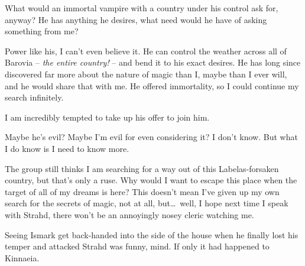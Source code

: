 What would an immortal vampire with a country under his control ask for, anyway? He has anything he desires, what need would he have of asking something from me?

Power like his, I can't even believe it. He can control the weather across all of Barovia -- \emph{the entire country!} -- and bend it to his exact desires. He has long since discovered far more about the nature of magic than I, maybe than I ever will, and he would share that with me. He offered immortality, so I could continue my search infinitely.

I am incredibly tempted to take up his offer to join him.

Maybe he's evil? Maybe I'm evil for even considering it? I don't know. But what I do know is I need to know more.

The group still thinks I am searching for a way out of this Labelas-forsaken country, but that's only a ruse. Why would I want to escape this place when the target of all of my dreams is here? This doesn't mean I've given up my own search for the secrets of magic, not at all, but\dots\ well, I hope next time I speak with Strahd, there won't be an annoyingly nosey cleric watching me.

Seeing Ismark get back-handed into the side of the house when he finally lost his temper and attacked Strahd was funny, mind. If only it had happened to Kinnaeia.

\sleep

